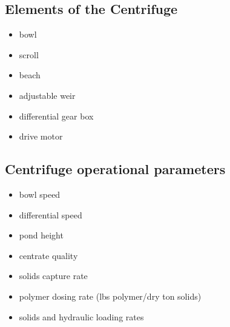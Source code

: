 \subsection{Elements of the Centrifuge}	


					\begin{itemize}
						\item bowl
						\item scroll
						\item beach
						\item adjustable weir
						\item differential gear box
						\item drive motor
					\end{itemize}

\subsection{Centrifuge operational parameters}	
					\begin{itemize}
						\item bowl speed
						\item differential speed
						\item pond height
						\item centrate quality
						\item solids capture rate
						\item polymer dosing rate (lbs polymer/dry ton solids)
						\item solids and hydraulic loading rates
					\end{itemize}

\newpage
